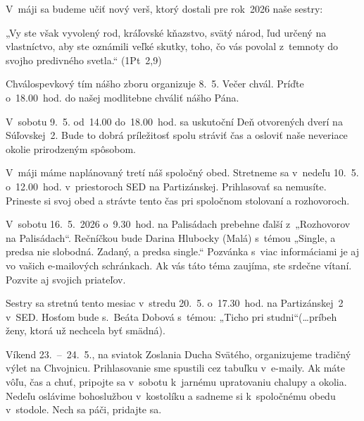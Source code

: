 \def\velkostpisma{10}
\def\velkostriadku{12.5}



V~máji sa budeme učiť nový verš, ktorý dostali pre rok~2026 naše sestry:

„Vy ste však vyvolený rod, kráľovské kňazstvo, svätý národ, ľud určený na vlastníctvo, aby ste oznámili veľké skutky, toho, čo vás povolal z~temnoty do svojho predivného svetla.“ (1Pt~2,9)




Chválospevkový tím nášho zboru organizuje 8.~5. Večer chvál. Príďte o~18.00~hod. do našej modlitebne chváliť nášho Pána.


V~sobotu 9.~5. od~14.00 do~18.00~hod. sa uskutoční Deň otvorených dverí na Súľovskej~2. Bude to dobrá príležitosť spolu stráviť čas a osloviť naše neveriace okolie prirodzeným spôsobom.


V~máji máme naplánovaný tretí náš spoločný obed. Stretneme sa v~nedeľu 10.~5. o~12.00~hod. v~priestoroch SED na Partizánskej. Prihlasovať sa nemusíte. Prineste si svoj obed a strávte tento čas pri spoločnom stolovaní a rozhovoroch.


V~sobotu 16.~5.~2026 o~9.30~hod. na Palisádach prebehne ďalší z~„Rozhovorov na Palisádach“. Rečníčkou bude Darina Hlubocky (Malá) s~témou „Single, a predsa nie slobodná. Zadaný, a predsa single.“ Pozvánka s~viac informáciami je aj vo vašich e-mailových schránkach. Ak vás táto téma zaujíma, ste srdečne vítaní. Pozvite aj svojich priateľov.


Sestry sa stretnú tento mesiac v~stredu 20.~5. o~17.30~hod. na Partizánskej~2 v~SED. Hosťom bude s.~Beáta Dobová s~témou: „Ticho pri studni“(…príbeh ženy, ktorá už nechcela byť smädná).


Víkend 23.~--~24.~5., na sviatok Zoslania Ducha Svätého, organizujeme tradičný výlet na Chvojnicu. Prihlasovanie sme spustili cez tabuľku v~e-maily. Ak máte vôľu, čas a chuť, pripojte sa v~sobotu k~jarnému upratovaniu chalupy a okolia. Nedeľu oslávime bohoslužbou v~kostolíku a sadneme si k~spoločnému obedu v~stodole.
Nech sa páči, pridajte sa.


